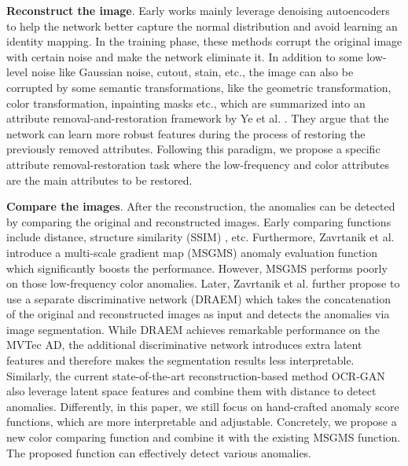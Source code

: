\documentclass[5p, twocolumn]{elsarticle}[draft]
\begin{document}
 \textbf{Reconstruct the image}. Early works mainly leverage denoising autoencoders\cite{mei2018unsupervised, kang2018deep,collin2021improved} to help the network better capture the normal distribution and avoid learning an identity mapping. In the training phase, these methods corrupt the original image with certain noise and make the network eliminate it. In addition to some low-level noise like Gaussian noise, cutout, stain, etc., the image can also be corrupted by some semantic transformations, like the geometric transformation\cite{golan2018deep,hendrycks2019using,huang2019inverse}, color transformation\cite{fei2020attribute}, inpainting masks\cite{haselmann2018anomaly,zavrtanik2021reconstruction,pirnay2022inpainting} etc., which are summarized into an attribute removal-and-restoration framework by Ye et al. \cite{fei2020attribute}. They argue that the network can learn more robust features during the process of restoring the previously removed attributes. Following this paradigm, we propose a specific attribute removal-restoration task where the low-frequency and color attributes are the main attributes to be restored.
 
\textbf{Compare the images}. After the reconstruction, the anomalies can be detected by comparing the original and reconstructed images. Early comparing functions include  distance, structure similarity (SSIM) \cite{wang2004image}, etc. Furthermore, Zavrtanik et al. \cite{zavrtanik2021reconstruction} introduce a multi-scale gradient map (MSGMS) anomaly evaluation function which significantly boosts the performance. However, MSGMS performs poorly on those low-frequency color anomalies. Later, Zavrtanik et al. \cite{zavrtanik2021draem} further propose to use a separate discriminative network (DRAEM) which takes the concatenation of the original and reconstructed images as input and detects the anomalies via image segmentation. While DRAEM achieves remarkable performance on the MVTec AD, the additional discriminative network introduces extra latent features and therefore makes the segmentation results less interpretable. Similarly, the current state-of-the-art reconstruction-based method OCR-GAN \cite{liang2022omni} also leverage latent space features and combine them with  distance to detect anomalies. Differently, in this paper, we still focus on hand-crafted anomaly score functions, which are more interpretable and adjustable. Concretely, we propose a new color comparing function and combine it with the existing MSGMS function. The proposed function can effectively detect various anomalies. 
\end{document}
